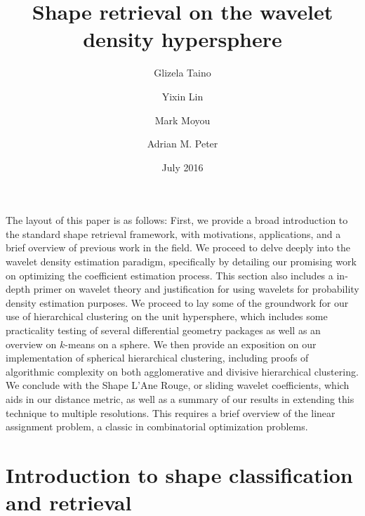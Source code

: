 \documentclass{article}
\begin{document}
\date{July 2016}

\title{Shape retrieval on the wavelet density hypersphere}
\author{Glizela Taino}
\author{Yixin Lin}

\author{Mark Moyou}
\author{Adrian M. Peter}
\setcounter{Maxaffil}{0}
\renewcommand\Affilfont{\small}
\maketitle



The layout of this paper is as follows:
  First, we provide a broad introduction to the standard shape retrieval framework, with motivations, applications, and a brief overview of previous work in the field. We proceed to delve deeply into the wavelet density estimation paradigm, specifically by detailing our promising work on optimizing the coefficient estimation process. This section also includes a in-depth primer on wavelet theory and justification for using wavelets for probability density estimation purposes. We proceed to lay some of the groundwork for our use of hierarchical clustering on the unit hypersphere, which includes some practicality testing of several differential geometry packages as well as an overview on $k$-means on a sphere. We then provide an exposition on our implementation of spherical hierarchical clustering, including proofs of algorithmic complexity on both agglomerative and divisive hierarchical clustering. We conclude with the Shape L'Ane Rouge, or sliding wavelet coefficients, which aids in our distance metric, as well as a summary of our results in extending this technique to multiple resolutions. This requires a brief overview of the linear assignment problem, a classic in combinatorial optimization problems.

\part{Introduction to shape classification and retrieval}
  
  
  
  
\end{document}
